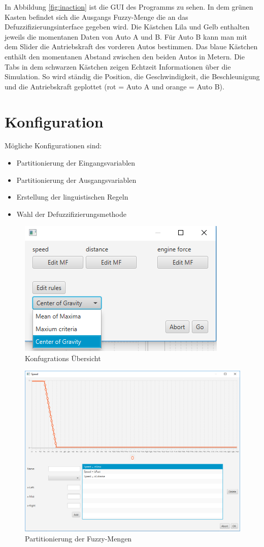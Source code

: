 \documentclass[12pt,a4paper,bibliography=totocnumbered,listof=totocnumbered, abstracton]{scrartcl}
\theoremstyle{Umgebung}
\begin{document}
In Abbildung \ref{fig:inaction} ist die GUI des Programms zu sehen. In dem grünen Kasten befindet sich die Ausgangs Fuzzy-Menge die an das Defuzzifizierungsinterface gegeben wird. Die Kästchen Lila und Gelb enthalten jeweils die momentanen Daten von Auto A und B. Für Auto B kann man mit dem Slider die Antriebskraft des vorderen Autos bestimmen. Das blaue Kästchen enthält den momentanen Abstand zwischen den beiden Autos in Metern. Die Tabs in dem schwarzen Kästchen zeigen Echtzeit Informationen über die Simulation. So wird ständig die Position, die Geschwindigkeit, die Beschleunigung und die Antriebskraft geplottet (rot = Auto A und  orange = Auto B).

\section{Konfiguration}

Mögliche Konfigurationen sind:

\begin{itemize}
	\item Partitionierung der Eingangsvariablen
	\item Partitionierung der Ausgangsvariablen
	\item Erstellung der linguistischen Regeln
	\item Wahl der Defuzzifizierungsmethode
\end{itemize}

\begin{figure}
	\centering
	\includegraphics[width=0.7\linewidth]{img/practical/config}
	\caption{Konfugrations Übersicht}
	\label{fig:config}
\end{figure}

\begin{figure}
	\centering
	\includegraphics[width=0.7\linewidth]{img/practical/mf}
	\caption{Partitionierung der Fuzzy-Mengen}
	\label{fig:mf}
\end{figure}
\end{document}
